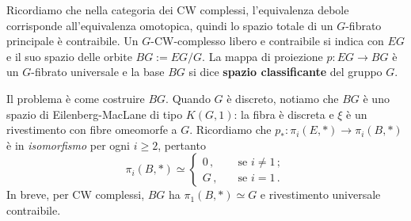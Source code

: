 Ricordiamo che nella categoria dei CW complessi, l'equivalenza debole
corrisponde all'equivalenza omotopica, quindi lo spazio totale
di un $G$-fibrato principale è contraibile.
Un $G$-CW-complesso libero e contraibile si indica con $EG$
e il suo spazio delle orbite $BG := EG/G$.
La mappa di proiezione $p:EG \to BG$ è un $G$-fibrato universale
e la base $BG$ si dice \textbf{spazio classificante} del gruppo $G$.


Il problema è come costruire $BG$.
Quando $G$ è discreto, notiamo che $BG$ è uno spazio
di Eilenberg-MacLane di tipo $K(G,1)$:
la fibra è discreta e $\xi$ è un rivestimento con fibre omeomorfe a $G$.
Ricordiamo che $p_{*} : \pi_{i}(E,\ast) \to \pi_{i}(B,\ast)$
è in \emph{isomorfismo} per ogni $i \ge 2$, pertanto
\begin{equation*}
	\pi_{i}(B,\ast) \simeq 
	\begin{cases}
		0\,, \quad &\text{se }i \ne 1\,; \\
		G\,, \quad &\text{se } i = 1\,.
	\end{cases}
\end{equation*}
In breve, per CW complessi, $BG$ ha $\pi_{1}(B,\ast) \simeq G$ e rivestimento universale contraibile.

